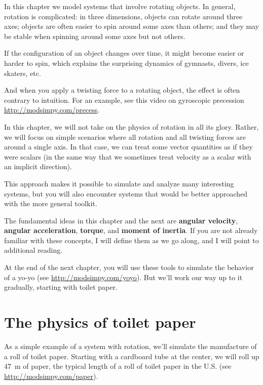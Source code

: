 \documentclass[12pt]{book}
\theoremstyle{exercise}
\begin{document}
In this chapter we model systems that involve rotating objects.  In general, rotation is complicated:  in three dimensions, objects can rotate around three axes; objects are often easier to spin around some axes than others; and they may be stable when spinning around some axes but not others.


If the configuration of an object changes over time, it might become easier or harder to spin, which explains the surprising dynamics of gymnasts, divers, ice skaters, etc.

And when you apply a twisting force to a rotating object, the effect is often contrary to intuition.  For an example, see this video on gyroscopic precession \url{http://modsimpy.com/precess}.


In this chapter, we will not take on the physics of rotation in all its glory.  Rather, we will focus on simple scenarios where all rotation and all twisting forces are around a single axis.  In that case, we can treat some vector quantities as if they were scalars (in the same way that we sometimes treat velocity as a scalar with an implicit direction).


This approach makes it possible to simulate and analyze many interesting systems, but you will also encounter systems that would be better approached with the more general toolkit.

The fundamental ideas in this chapter and the next are {\bf angular velocity}, {\bf angular acceleration}, {\bf torque}, and {\bf moment of inertia}.  If you are not already familiar with these concepts, I will define them as we go along, and I will point to additional reading.

At the end of the next chapter, you will use these tools to simulate the behavior of a yo-yo (see \url{http://modsimpy.com/yoyo}).  But we'll work our way up to it gradually, starting with toilet paper.



\section{The physics of toilet paper}
\label{paper}

As a simple example of a system with rotation, we'll simulate the manufacture of a roll of toilet paper.  Starting with a cardboard tube at the center, we will roll up \SI{47}{\meter} of paper, the typical length of a roll of toilet paper in the U.S. (see \url{http://modsimpy.com/paper}).
\end{document}
